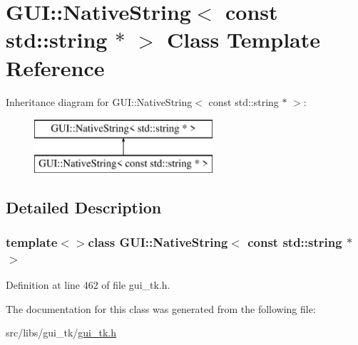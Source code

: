 \hypertarget{classGUI_1_1NativeString_3_01const_01std_1_1string_01_5_01_4}{\section{G\-U\-I\-:\-:Native\-String$<$ const std\-:\-:string $\ast$ $>$ Class Template Reference}
\label{classGUI_1_1NativeString_3_01const_01std_1_1string_01_5_01_4}
}
Inheritance diagram for G\-U\-I\-:\-:Native\-String$<$ const std\-:\-:string $\ast$ $>$\-:\begin{figure}[H]
\begin{center}
\leavevmode
\includegraphics[height=2.000000cm]{classGUI_1_1NativeString_3_01const_01std_1_1string_01_5_01_4}
\end{center}
\end{figure}


\subsection{Detailed Description}
\subsubsection*{template$<$$>$class G\-U\-I\-::\-Native\-String$<$ const std\-::string $\ast$ $>$}



Definition at line 462 of file gui\-\_\-tk.\-h.



The documentation for this class was generated from the following file\-:\begin{DoxyCompactItemize}
\item 
src/libs/gui\-\_\-tk/\hyperlink{gui__tk_8h}{gui\-\_\-tk.\-h}\end{DoxyCompactItemize}

